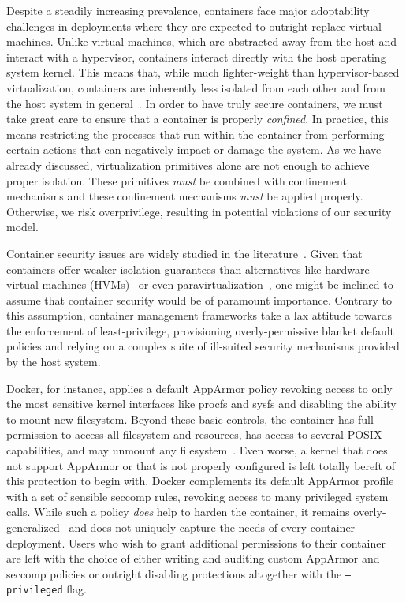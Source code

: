 Despite a steadily increasing prevalence, containers face major adoptability challenges in
deployments where they are expected to outright replace virtual machines. Unlike virtual
machines, which are abstracted away from the host and interact with a hypervisor,
containers interact directly with the host operating system kernel. This means that, while
much lighter-weight than hypervisor-based virtualization, containers are inherently less
isolated from each other and from the host system in
general~\cite{sultan2019_container_security, xin2018_container_security,
mullinix2020_security_measures, bui2015_docker_analysis}.  In order to have truly secure
containers, we must take great care to ensure that a container is properly
\textit{confined}. In practice, this means restricting the processes that run within the
container from performing certain actions that can negatively impact or damage the system.
As we have already discussed, virtualization primitives alone are not enough to achieve
proper isolation. These primitives \textit{must} be combined with confinement mechanisms
and these confinement mechanisms \textit{must} be applied properly. Otherwise, we risk
overprivilege, resulting in potential violations of our security model.

Container security issues are widely studied in the
literature~\cite{sultan2019_container_security, xin2018_container_security,
mp2016_hardening, mullinix2020_security_measures, bui2015_docker_analysis}.  Given that
containers offer weaker isolation guarantees than alternatives like hardware virtual
machines (HVMs)~ or even paravirtualization~, one might be inclined
to assume that container security would be of paramount importance. Contrary to this
assumption, container management frameworks take a lax attitude towards the enforcement of
least-privilege, provisioning overly-permissive blanket default policies and relying on
a complex suite of ill-suited security mechanisms provided by the host system.

Docker, for instance, applies a default AppArmor policy revoking access to only the most
sensitive kernel interfaces like procfs and sysfs and disabling the ability to mount new
filesystem.  Beyond these basic controls, the container has full permission to access all
filesystem and resources, has access to several POSIX capabilities, and may unmount any
filesystem~\cite{docker_apparmor, docker_default_apparmor}. Even worse, a kernel that does
not support AppArmor or that is not properly configured is left totally bereft of this
protection to begin with.  Docker complements its default AppArmor profile with a set of
sensible seccomp rules, revoking access to many privileged system calls. While such
a policy \textit{does} help to harden the container, it remains
overly-generalized~\cite{sultan2019_container_security} and does not uniquely capture the
needs of every container deployment. Users who wish to grant additional permissions to
their container are left with the choice of either writing and auditing custom AppArmor
and seccomp policies or outright disabling protections altogether with the
\texttt{--privileged} flag.

